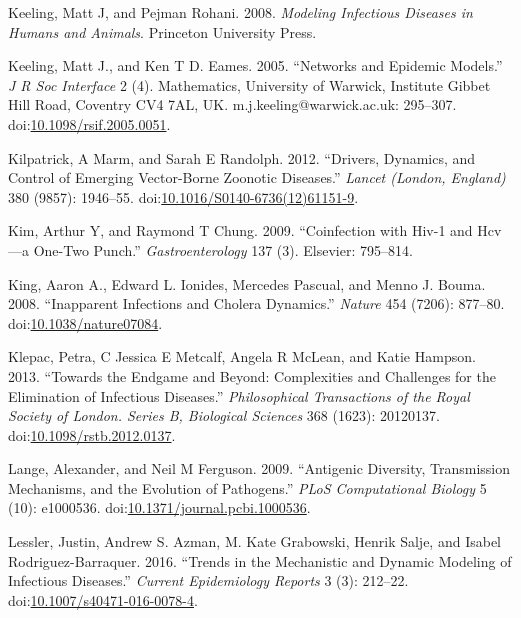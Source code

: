 \documentclass[]{book}
\theoremstyle{definition}
\theoremstyle{definition}
\theoremstyle{definition}
\theoremstyle{remark}
\begin{document}
\hypertarget{ref-keeling08}{}
Keeling, Matt J, and Pejman Rohani. 2008. \emph{Modeling Infectious
Diseases in Humans and Animals}. Princeton University Press.

\hypertarget{ref-keeling05}{}
Keeling, Matt J., and Ken T D. Eames. 2005. ``Networks and Epidemic
Models.'' \emph{J R Soc Interface} 2 (4). Mathematics, University of
Warwick, Institute Gibbet Hill Road, Coventry CV4 7AL, UK.
m.j.keeling@warwick.ac.uk: 295--307.
doi:\href{https://doi.org/10.1098/rsif.2005.0051}{10.1098/rsif.2005.0051}.

\hypertarget{ref-kilpatrick12}{}
Kilpatrick, A Marm, and Sarah E Randolph. 2012. ``Drivers, Dynamics, and
Control of Emerging Vector-Borne Zoonotic Diseases.'' \emph{Lancet
(London, England)} 380 (9857): 1946--55.
doi:\href{https://doi.org/10.1016/S0140-6736(12)61151-9}{10.1016/S0140-6736(12)61151-9}.

\hypertarget{ref-kim09}{}
Kim, Arthur Y, and Raymond T Chung. 2009. ``Coinfection with Hiv-1 and
Hcv---a One-Two Punch.'' \emph{Gastroenterology} 137 (3). Elsevier:
795--814.

\hypertarget{ref-king08}{}
King, Aaron A., Edward L. Ionides, Mercedes Pascual, and Menno J. Bouma.
2008. ``Inapparent Infections and Cholera Dynamics.'' \emph{Nature} 454
(7206): 877--80.
doi:\href{https://doi.org/10.1038/nature07084}{10.1038/nature07084}.

\hypertarget{ref-klepac13}{}
Klepac, Petra, C Jessica E Metcalf, Angela R McLean, and Katie Hampson.
2013. ``Towards the Endgame and Beyond: Complexities and Challenges for
the Elimination of Infectious Diseases.'' \emph{Philosophical
Transactions of the Royal Society of London. Series B, Biological
Sciences} 368 (1623): 20120137.
doi:\href{https://doi.org/10.1098/rstb.2012.0137}{10.1098/rstb.2012.0137}.

\hypertarget{ref-lange09}{}
Lange, Alexander, and Neil M Ferguson. 2009. ``Antigenic Diversity,
Transmission Mechanisms, and the Evolution of Pathogens.'' \emph{PLoS
Computational Biology} 5 (10): e1000536.
doi:\href{https://doi.org/10.1371/journal.pcbi.1000536}{10.1371/journal.pcbi.1000536}.

\hypertarget{ref-lessler16}{}
Lessler, Justin, Andrew S. Azman, M. Kate Grabowski, Henrik Salje, and
Isabel Rodriguez-Barraquer. 2016. ``Trends in the Mechanistic and
Dynamic Modeling of Infectious Diseases.'' \emph{Current Epidemiology
Reports} 3 (3): 212--22.
doi:\href{https://doi.org/10.1007/s40471-016-0078-4}{10.1007/s40471-016-0078-4}.
\end{document}
